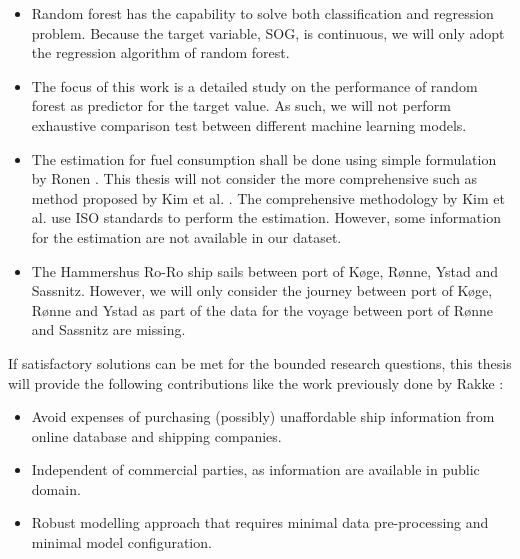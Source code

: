 \begin{itemize}
    \item Random forest has the capability to solve both classification and regression problem. Because the target variable, SOG, is continuous, we will only adopt the regression algorithm of random forest.
    \item The focus of this work is a detailed study on the performance of random forest as predictor for the target value. As such, we will not perform exhaustive comparison test between different machine learning models.
    \item The estimation for fuel consumption shall be done using simple formulation by Ronen \cite{Ronen.1982,Ronen.2011}. This thesis will not consider the more comprehensive such as method proposed by Kim et al. \cite{Kim.2020}. The comprehensive methodology by Kim et al. \cite{Kim.2020} use ISO standards to perform the estimation. However, some information for the estimation are not available in our dataset. 
    \item The Hammershus Ro-Ro ship sails between port of K{\o}ge, R{\o}nne, Ystad and Sassnitz. However, we will only consider the journey between port of K{\o}ge, R{\o}nne and Ystad as part of the data for the voyage between port of R{\o}nne and Sassnitz are missing. 
\end{itemize}

If satisfactory solutions can be met for the bounded research questions, this thesis will provide the following contributions like  the work previously done by Rakke \cite{Rakke2016} : 

\begin{itemize}
    \item Avoid expenses of purchasing (possibly) unaffordable ship information from online database and shipping companies. 
    \item Independent of commercial parties, as information are available in public domain.
    \item Robust modelling approach that requires minimal data pre-processing and minimal model configuration.   
\end{itemize}






 






